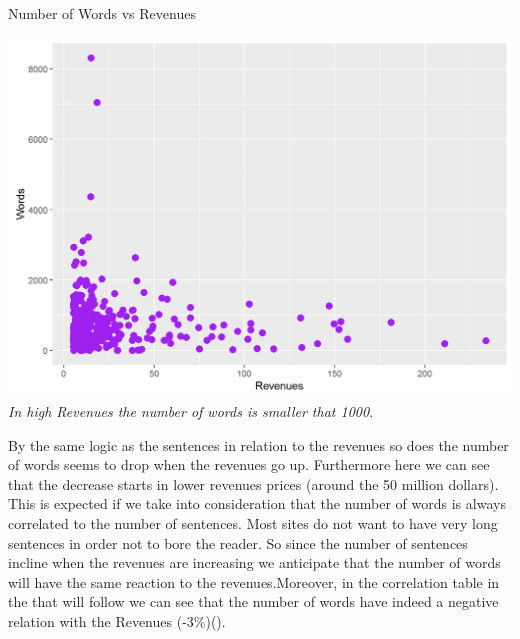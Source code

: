 \documentclass{book}
\begin{document}
\begin{table}[H]
\centering
\caption{Number of Words vs Revenues}
\begin{center}
\includegraphics[scale=0.4]{../R/photos/37_w_rev.png}   \\
\textit{In high Revenues the number of words is smaller that 1000.}
\end{center}
\end{table}
By the same logic as the sentences in relation to the revenues so does the number of words seems to drop when the revenues go up. Furthermore here we can see that the decrease starts in lower revenues prices (around the 50 million dollars). This is expected if we take into consideration that the number of words is always correlated to the number of sentences. Most sites do not want to have very long sentences in order not to bore the reader. So since the number of sentences incline when the revenues are increasing we anticipate that the number of words will have the same reaction to the revenues.Moreover, in the correlation table in the that will follow we can see that the number of words have indeed a negative relation with the Revenues (-3\%)(\pageref{lod}).
\end{document}
